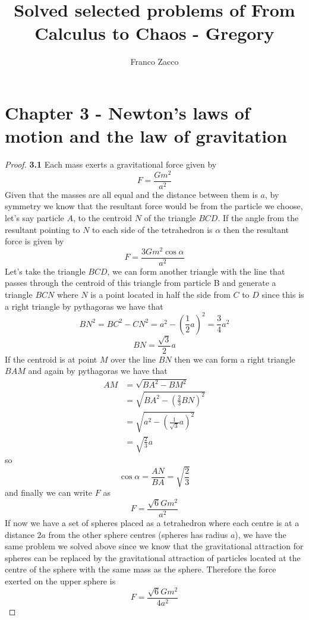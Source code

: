 \documentclass[11pt]{article}
\title{\textbf{Solved selected problems of From Calculus to Chaos - Gregory}}
\author{Franco Zacco}
\date{}
\begin{document}
\maketitle
\thispagestyle{empty}

\section*{Chapter 3 - Newton's laws of motion and the law of gravitation}

	\begin{proof}{\textbf{3.1}}
        Each mass exerts a gravitational force given by
        $$F = \frac{Gm^2}{a^2}$$
        Given that the masses are all equal and the distance between them is
        $a$, by symmetry we know that the resultant force would be from
        the particle we choose, let's say particle $A$, to the centroid $N$ of the 
        triangle $BCD$. If the angle from the resultant pointing to $N$ to each side of
        the tetrahedron is $\alpha$ then the resultant force is given by
        $$F = \frac{3Gm^2\cos{\alpha}}{a^2}$$
        Let's take the triangle $BCD$, we can form another triangle with the
        line that passes through the centroid of this triangle from particle B
        and generate a triangle $BCN$ where $N$ is a point located in half the
        side from $C$ to $D$ since this is a right triangle by pythagoras we
        have that
        $$BN^2 = BC^2 - CN^2 = a^2 - ( \frac{1}{2}a)^2 = \frac{3}{4}a^2$$
        $$BN = \frac{\sqrt{3}}{2}a$$
        If the centroid is at point $M$ over the line $BN$ then we can
        form a right triangle $BAM$ and again by pythagoras we have that
        \begin{align*}
        AM &= \sqrt{BA^2 - BM^2} \\
           &= \sqrt{BA^2 - (\frac{2}{3}BN)^2} \\
           &= \sqrt{a^2 - (\frac{1}{\sqrt{3}}a)^2} \\
           &= \sqrt{\frac{2}{3}}a
        \end{align*}
        so
        $$\cos{\alpha} = \frac{AN}{BA} = \sqrt{\frac{2}{3}}$$
        and finally we can write $F$ as
        $$F = \frac{\sqrt{6}Gm^2}{a^2}$$
        If now we have a set of spheres placed as a tetrahedron where each centre
        is at a distance $2a$ from the other sphere centres (spheres has radius
        $a$), we have the same problem we solved above since we know that the
        gravitational attraction for spheres can be replaced by the
        gravitational attraction of particles located at the centre of the
        sphere with the same mass as the sphere. Therefore the force exerted on
        the upper sphere is
        $$F = \frac{\sqrt{6}Gm^2}{4a^2}$$
    \end{proof}
\end{document}
